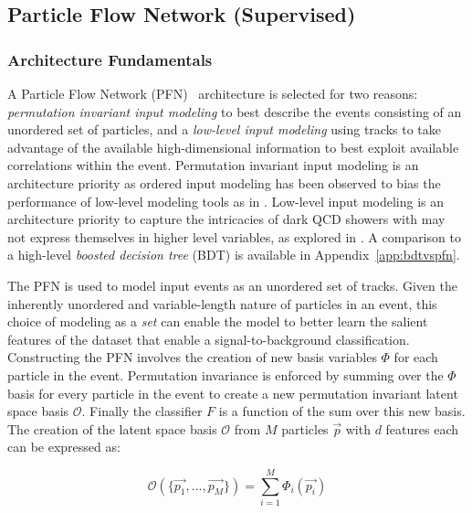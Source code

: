 \subsection{Particle Flow Network (Supervised)}
\label{subsec:supervised}
\subsubsection{Architecture Fundamentals}

A Particle Flow Network (PFN)~\cite{pfn} architecture is selected for two reasons: \textit{permutation invariant input modeling} to best describe the events consisting of an unordered set of particles, and a \textit{low-level input modeling} using tracks to take advantage of the available high-dimensional information to best exploit available correlations within the event. Permutation invariant input modeling is an architecture priority as ordered input modeling has been observed to bias the performance of low-level modeling tools as in \cite{vrnn}. Low-level input modeling is an architecture priority to capture the intricacies of dark QCD showers with may not express themselves in higher level variables, as explored in \cite{darkqcd}. A comparison to a high-level \textit{boosted decision tree} (BDT) is available in Appendix~\ref{app:bdtvspfn}.

The PFN is used to model input events as an unordered set of tracks. Given the inherently unordered and variable-length nature of particles in an event, this choice of modeling as a \textit{set} can enable the model to better learn the salient features of the dataset that enable a signal-to-background classification. Constructing the PFN involves the creation of new basis variables $\Phi$ for each particle in the event. Permutation invariance is enforced by summing over the $\Phi$ basis for every particle in the event to create a new permutation invariant latent space basis $\mathcal{O}$. Finally the classifier $F$ is a function of the sum over this new basis. The creation of the latent space basis $\mathcal{O}$ from $M$ particles $\vec{p}$ with $d$ features each can be expressed as:

\begin{equation}
  \mathcal{O}(\{\vec{p_1},...,\vec{p_M}\}) = \sum_{i=1}^M \Phi_i(\vec{p_i})
  \label{eq:pfn}
\end{equation}

